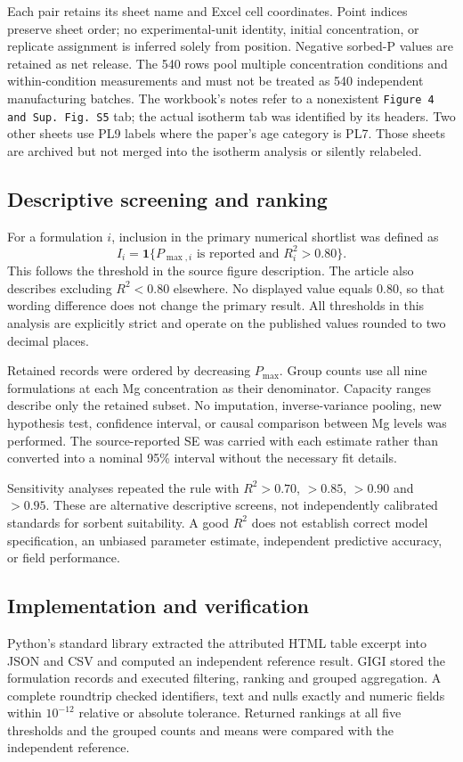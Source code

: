 \documentclass[11pt,letterpaper]{article}
\begin{document}
Each pair retains its sheet name and Excel cell coordinates. Point indices preserve sheet order; no experimental-unit identity, initial concentration, or replicate assignment is inferred solely from position. Negative sorbed-P values are retained as net release. The 540 rows pool multiple concentration conditions and within-condition measurements and must not be treated as 540 independent manufacturing batches. The workbook's notes refer to a nonexistent \texttt{Figure 4 and Sup. Fig. S5} tab; the actual isotherm tab was identified by its headers. Two other sheets use PL9 labels where the paper's age category is PL7. Those sheets are archived but not merged into the isotherm analysis or silently relabeled.

\subsection{Descriptive screening and ranking}
For a formulation $i$, inclusion in the primary numerical shortlist was defined as
\begin{equation}
I_i=\mathbf{1}\{P_{\max,i}\text{ is reported and }R_i^2>0.80\}.
\label{eq:screen}
\end{equation}
This follows the threshold in the source figure description. The article also describes excluding $R^2<0.80$ elsewhere. No displayed value equals 0.80, so that wording difference does not change the primary result. All thresholds in this analysis are explicitly strict and operate on the published values rounded to two decimal places.

Retained records were ordered by decreasing $P_{\max}$. Group counts use all nine formulations at each Mg concentration as their denominator. Capacity ranges describe only the retained subset. No imputation, inverse-variance pooling, new hypothesis test, confidence interval, or causal comparison between Mg levels was performed. The source-reported SE was carried with each estimate rather than converted into a nominal 95\% interval without the necessary fit details.

Sensitivity analyses repeated the rule with $R^2>0.70$, $>0.85$, $>0.90$ and $>0.95$. These are alternative descriptive screens, not independently calibrated standards for sorbent suitability. A good $R^2$ does not establish correct model specification, an unbiased parameter estimate, independent predictive accuracy, or field performance.

\subsection{Implementation and verification}
Python's standard library extracted the attributed HTML table excerpt into JSON and CSV and computed an independent reference result. GIGI stored the formulation records and executed filtering, ranking and grouped aggregation. A complete roundtrip checked identifiers, text and nulls exactly and numeric fields within $10^{-12}$ relative or absolute tolerance. Returned rankings at all five thresholds and the grouped counts and means were compared with the independent reference.
\end{document}
